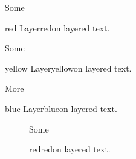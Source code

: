 \documentclass{article}
\begin{document}
Some \begin{ocg}{red Layer}{red}{on}
{\color{red}layered text.}
\end{ocg}

Some \begin{ocg}{yellow Layer}{yellow}{on}
{\color{yellow}layered text.}
\end{ocg}

\newpage

More \begin{ocg}{blue Layer}{blue}{on}
{\color{blue}layered text.}
\end{ocg}

\begin{figure}[p]

Some \begin{ocg}{red}{red}{on}
{\color{red}layered text.}
\end{ocg}

\end{figure}
\end{document}
